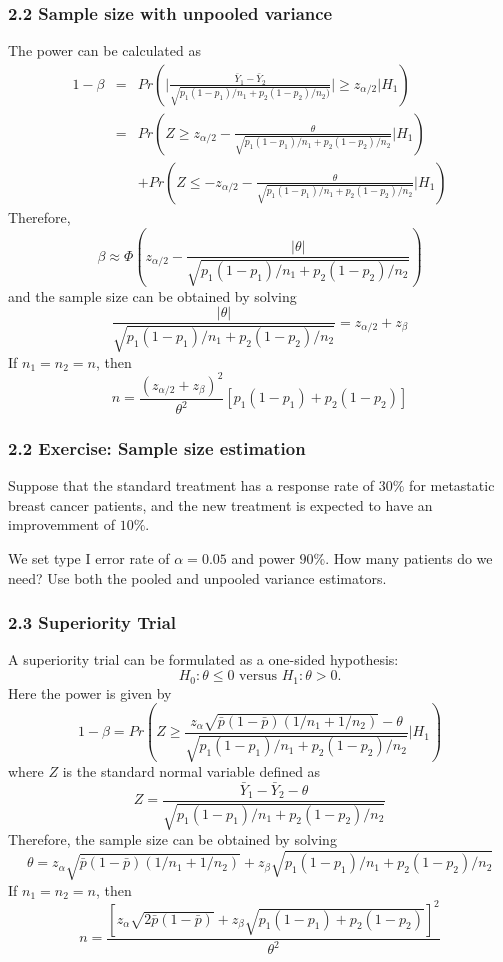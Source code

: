 \documentclass[table,10pt]{beamer}
\begin{document}
\begin{CJK*}{UTF8}{gbsn}
\begin{frame}[t]
\frametitle{2.2 Sample size with unpooled variance}
The power can be calculated as
$$
\begin{array}{lcl}
1-\beta &=& Pr \left( \big| \frac{\bar{Y}_1 - \bar{Y}_2}{\sqrt{p_1 (1-p_1)/n_1+ p_2(1-p_2)/n_2)}} \big| \ge z_{\alpha/2} \big| H_1 \right)\\
&=& Pr \left( Z \ge z_{\alpha/2} - \frac{\theta}{\sqrt{p_1(1-p_1)/n_1 + p_2(1-p_2)/n_2}} \big| H_1 \right)\\
 & & + Pr \left( Z \le -z_{\alpha/2} - \frac{\theta}{\sqrt{p_1(1-p_1)/n_1 + p_2(1-p_2)/n_2}} \big| H_1 \right)
\end{array}
$$
Therefore,
$$
\beta \approx \Phi \left( z_{\alpha/2} - \frac{|\theta|}{\sqrt{p_1(1-p_1)/n_1 + p_2(1-p_2)/n_2}}\right)
$$
and the sample size can be obtained by solving
$$
\frac{|\theta|}{\sqrt{p_1(1-p_1)/n_1 + p_2(1-p_2)/n_2}} = z_{\alpha/2} + z_{\beta}
$$
If $n_1 = n_2 = n$, then
$$
n = \frac{(z_{\alpha/2}+z_{\beta})^2}{\theta^2}\left[ p_1(1-p_1) + p_2(1-p_2)\right]
$$
\end{frame}

\begin{frame}[t]
\frametitle{2.2 Exercise: Sample size estimation}
Suppose that the standard treatment has a response rate of $30\%$ for metastatic breast cancer patients, and the new treatment is expected to 
have an improvemment of $10\%$.

We set type I error rate of $\alpha=0.05$ and power $90\%$. How many 
patients do we need? Use both the pooled and unpooled variance 
estimators.
\end{frame}


\begin{frame}[t]
\frametitle{2.3 Superiority Trial}
A superiority trial can be formulated as a one-sided hypothesis:
$$
H_0: \theta \le 0 \mbox{ versus } H_1: \theta > 0.
$$
Here the power is given by
$$
1-\beta = Pr \left( Z \ge \frac{z_{\alpha} \sqrt{\bar{p}(1-\bar{p})(1/n_1 + 1/n_2)} - \theta}{\sqrt{p_1(1-p_1)/n_1 + p_2(1-p_2)/n_2}} \big| H_1\right)
$$
where $Z$ is the standard normal variable defined as
$$
Z = \frac{\bar{Y}_1 - \bar{Y}_2 - \theta}{\sqrt{p_1(1-p_1)/n_1 + p_2(1-p_2)/n_2}}
$$
Therefore, the sample size can be obtained by solving
$$
\theta = z_{\alpha} \sqrt{\bar{p}(1-\bar{p})(1/n_1+1/n_2)} + z_{\beta} \sqrt{p_1(1-p_1)/n_1 + p_2(1-p_2)/n_2}
$$
If $n_1 = n_2 = n$, then
$$
n = \frac{\left[ z_{\alpha} \sqrt{2\bar{p}(1-\bar{p})} + z_{\beta} \sqrt{p_1(1-p_1) + p_2(1-p_2)}\right]^2}{\theta^2}
$$
\end{frame}



\end{CJK*}
\end{document}
